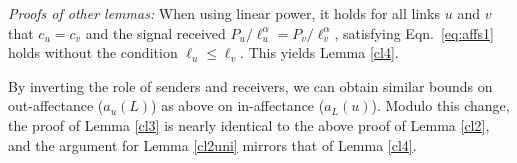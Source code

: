 \documentclass[11pt]{amsart}
\begin{document}
\medskip

\emph{Proofs of other lemmas:} When using linear power, it holds for all links $u$ and $v$ that
$c_u = c_v$ and the signal received $P_u/\ell_u^\alpha = P_v/\ell_v^\alpha$,
satisfying Eqn.~\ref{eq:affs1} holds without the condition $\ell_u \le \ell_v$.
This yields Lemma \ref{cl4}.

By inverting the role of senders and receivers, we can obtain similar
bounds on out-affectance ($a_u(L)$) as above on in-affectance ($a_L(u)$).
Modulo this change, the proof of Lemma \ref{cl3} is nearly identical
to the above proof of Lemma \ref{cl2}, and the argument for Lemma
\ref{cl2uni} mirrors that of Lemma \ref{cl4}.
\end{document}
